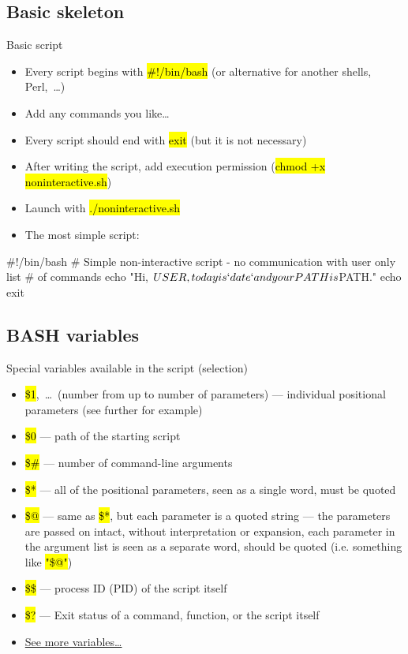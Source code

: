 \documentclass[compress, ucs, xelatex, 11pt, xcolor=svgnames,
  hyperref={
    bookmarks=true,
    unicode=true,
    colorlinks=true,
    pdftitle={Linux, command line and MetaCentrum},
    plainpages=false,
    pdfauthor={Vojtech Zeisek},
    pdfsubject={Course about use of Linux command line, writing shell scripts and using MetaCentrum of CESNET},
    pdfcreator={XeLaTeX},
    pdfkeywords={Linux, GNU, BASH, shell, command line, MetaCentrum},
    linkcolor=DarkRed,
    anchorcolor=DarkBlue,
    citecolor=Indigo,
    filecolor=NavyBlue,
    menucolor=DarkMagenta,
    urlcolor=DarkBlue,
    pdftex},
  url={hyphens, lowtilde} %
  ]{beamer}
\renewcommand{\texttt}[1]{\hl{\ttfamily #1}}
\renewcommand{\alert}[1]{\textcolor{red}{#1}}
\begin{document}
\subsection{Basic skeleton}

\begin{frame}[fragile]{Basic script}
  \begin{itemize}
    \item Every script begins with \texttt{\#!/bin/bash} (or alternative for another shells, Perl,~\ldots)
    \item Add any commands you like\ldots
    \item Every script should end with \texttt{exit} (but it is not necessary)
    \item After writing the script, add execution permission (\texttt{chmod +x noninteractive.sh})
    \item Launch with \texttt{./noninteractive.sh}
    \item The most simple script:
  \end{itemize}
  \begin{bashcode}
    #!/bin/bash
    # Simple non-interactive script - no communication with user only list
    # of commands
    echo "Hi, $USER, today is `date` and your PATH is $PATH."
    echo
    exit
  \end{bashcode}
\end{frame}

\subsection{BASH variables}

\begin{frame}{Special variables available in the script (selection)}
  \begin{itemize}
    \item \alert{\texttt{\$1}},~\ldots~(number from \texttt{1} up to number of parameters) --- individual positional parameters (see further for example)
    \item \alert{\texttt{\$0}} --- path of the starting script
    \item \alert{\texttt{\$\#}} --- number of command-line arguments
    \item \alert{\texttt{\$*}} --- all of the positional parameters, seen as a single word, must be quoted
    \item \alert{\texttt{\$@}} --- same as \texttt{\$*}, but each parameter is a quoted string --- the parameters are passed on intact, without interpretation or expansion, each parameter in the argument list is seen as a separate word, should be quoted (i.e. something like \texttt{"\$@"})
    \item \alert{\texttt{\$\$}} --- process ID (PID) of the script itself
    \item \alert{\texttt{\$?}} --- Exit status of a command, function, or the script itself
    \item \href{https://www.tldp.org/LDP/abs/html/internalvariables.html}{See more variables\ldots}
  \end{itemize}
\end{frame}
\end{document}

